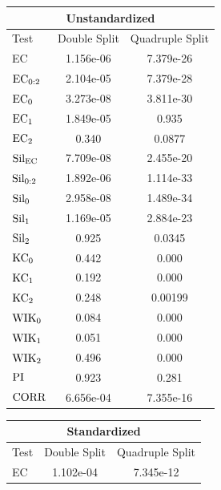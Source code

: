 \documentclass[12pt]{article}
\begin{document}
\begin{table}[htp!]
    \begin{center}
        \begin{tabular}{ l | c | c }
          \toprule
          \multicolumn{3}{c}{Unstandardized} \\
          \toprule
          Test & Double Split & Quadruple Split \\
          \midrule
          EC & 1.156e-06 & 7.379e-26 \\
          $\textup{EC}_{0:2}$ & 2.104e-05 & 7.379e-28 \\
          $\textup{EC}_{0}$ & 3.273e-08 & 3.811e-30 \\
          $\textup{EC}_{1}$ &  1.849e-05 & 0.935 \\
          $\textup{EC}_{2}$ & 0.340 & 0.0877 \\
          \midrule
          $\textup{Sil}_{\textup{EC}}$ & 7.709e-08 & 2.455e-20 \\ 
          $\textup{Sil}_{0:2}$ & 1.892e-06 & 1.114e-33 \\
          $\textup{Sil}_{0}$ & 2.958e-08 & 1.489e-34 \\
          $\textup{Sil}_{1}$ & 1.169e-05 & 2.884e-23 \\
          $\textup{Sil}_{2}$ & 0.925 & 0.0345 \\
          \midrule
          $\textup{KC}_{0}$ & 0.442 & 0.000 \\
          $\textup{KC}_{1}$ & 0.192 & 0.000 \\
          $\textup{KC}_{2}$ & 0.248 & 0.00199 \\
          \midrule
          $\textup{WIK}_{0}$ & 0.084 & 0.000 \\
          $\textup{WIK}_{1}$ & 0.051 & 0.000 \\
          $\textup{WIK}_{2}$ & 0.496 & 0.000 \\
          $\textup{PI}$ & 0.923 & 0.281 \\
          \midrule
          $\textup{CORR}$ & 6.656e-04 & 7.355e-16 \\
          \bottomrule
        \end{tabular}
        \begin{tabular}{ l | c |  c }
          \toprule
          \multicolumn{3}{c}{Standardized} \\
          \toprule
          Test & Double Split & Quadruple Split \\
          \midrule
          EC & 1.102e-04 &  7.345e-12 \\

\end{tabular}
\end{center}
\end{table}
\end{document}
